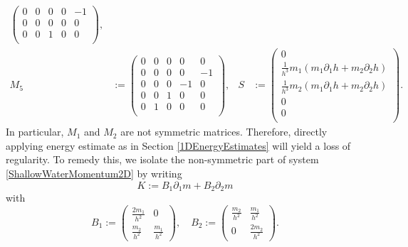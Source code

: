 \documentclass[reqno,11pt]{amsart}
\DeclareMathOperator{\Div}{div}
\theoremstyle{plain}
\theoremstyle{definition}
\numberwithin{equation}{section}
\begin{document}
\begin{equation}
\begin{aligned}
\begin{pmatrix}
    0 & 0 & 0 & 0 & -1 \\
    0 & 0 & 0 & 0 & 0 \\
    0 & 0 & 1 & 0 & 0 \\
\end{pmatrix}, \\
M_5 &:=\begin{pmatrix}
    0 & 0 & 0 & 0 & 0 \\
    0 & 0 & 0 & 0 & -1 \\
    0 & 0 & 0 & -1 & 0 \\
    0 & 0 & 1 & 0 & 0 \\
    0 & 1 & 0 & 0 & 0 \\
\end{pmatrix}, & S&:=\begin{pmatrix}
    0 \\
    \frac{1}{h^3} m_1 (m_1 \partial_1 h + m_2 \partial_2 h) \\
    \frac{1}{h^3} m_2 (m_1 \partial_1 h + m_2 \partial_2 h)  \\
    0 \\
    0 \\
\end{pmatrix}.
\end{aligned}
\end{equation}
In particular, $ M_1 $ and $ M_2 $ are not symmetric matrices. Therefore, directly applying energy estimate as in Section \ref{1DEnergyEstimates} will yield a loss of regularity. To remedy this, we isolate the non-symmetric part of system \eqref{ShallowWaterMomentum2D} by writing
\begin{equation}
    \label{def:2d-non-sym}
    K:= B_1 \partial_1 m + B_2 \partial_2 m
\end{equation}
with
\begin{equation}
    \label{def:non-sym-matrix-2d}
    B_1 := \begin{pmatrix}
        \frac{2m_1}{h^2} & 0 \\
        \frac{m_2}{h^2} & \frac{m_1}{h^2}
    \end{pmatrix}, \quad B_2 := \begin{pmatrix}
        \frac{m_2}{h^2} & \frac{m_1}{h^2} \\
        0 & \frac{2m_2}{h^2}
    \end{pmatrix}.
\end{equation}
\end{document}
